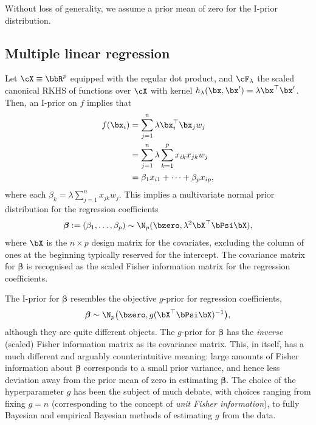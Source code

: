 Without loss of generality, we assume a prior mean of zero for the I-prior distribution.

\subsection{Multiple linear regression}

Let $\cX\equiv \bbR^p$ equipped with the regular dot product, and $\cF_\lambda$ the scaled canonical RKHS of functions over $\cX$ with kernel $h_\lambda(\bx,\bx') = \lambda \bx^\top\bx'$. 
Then, an I-prior on $f$ implies that 
\begin{align*}
  f(\bx_i) &= \sum_{j=1}^n \lambda \bx_i^\top\bx_j w_j \\
  &= \sum_{j=1}^n \lambda \sum_{k=1}^p x_{ik}x_{jk} w_j \\
  &= \beta_1 x_{i1}+ \dots + \beta_p x_{ip},
\end{align*}
where each $\beta_k = \lambda \sum_{j=1}^n  x_{jk}w_j$.
This implies a multivariate normal prior distribution for the regression coefficients   
\begin{align*}
  \boldsymbol\beta := (\beta_1,\dots,\beta_p) \sim \N_p(\bzero, \lambda^2 \bX^\top \bPsi \bX),
\end{align*}
where $\bX$ is the $n \times p$ design matrix for the covariates, excluding the column of ones at the beginning typically reserved for the intercept. 
The covariance matrix for $\boldsymbol\beta$ is recognised as the scaled Fisher information matrix for the regression coefficients.

The I-prior for $\boldsymbol{\beta}$ resembles the objective $g$-prior \citep{zellner1986assessing} for regression coefficients,
\[
  \boldsymbol{\beta} \sim \N_p\big(\bzero, g (\bX^\top \bPsi \bX)^{-1} \big),
\]
although they are quite different objects. 
The $g$-prior for $\boldsymbol{\beta}$ has the \emph{inverse} (scaled) Fisher information matrix as its covariance matrix.
This, in itself, has a much different and arguably counterintuitive meaning: large amounts of Fisher information about $\boldsymbol{\beta}$ corresponds to a small prior variance, and hence less deviation away from the prior mean of zero in estimating $\boldsymbol\beta$.
The choice of the hyperparameter $g$ has been the subject of much debate, with choices ranging from fixing $g=n$ (corresponding to the concept of \emph{unit Fisher information}), to fully Bayesian and empirical Bayesian methods of estimating $g$ from the data.

